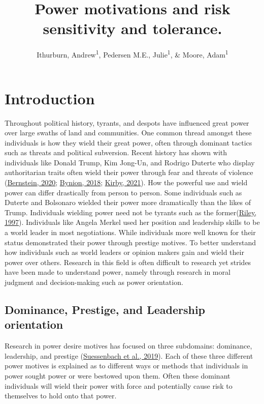 \documentclass[
  donotrepeattitle,doc, 12pt, a4paper,floatsintext]{apa7}
\title{Power motivations and risk sensitivity and tolerance.}
\author{Ithurburn, Andrew\textsuperscript{1}, Pedersen M.E., Julie\textsuperscript{1}, \& Moore, Adam\textsuperscript{1}}
\date{}
\affiliation{\vspace{0.5cm}\textsuperscript{1} The University of Edinburgh}
\begin{document}
\maketitle

\hypertarget{introduction}{%
\section{Introduction}\label{introduction}}

Throughout political history, tyrants, and despots have influenced great power over large swaths of land and communities. One common thread amongst these individuals is how they wield their great power, often through dominant tactics such as threats and political subversion. Recent history has shown with individuals like Donald Trump, Kim Jong-Un, and Rodrigo Duterte who display authoritarian traits often wield their power through fear and threats of violence (\protect\hyperlink{ref-bernstein2020}{Bernstein, 2020}; \protect\hyperlink{ref-bynion2018}{Bynion, 2018}; \protect\hyperlink{ref-kirby2021}{Kirby, 2021}). How the powerful use and wield power can differ drastically from person to person. Some individuals such as Duterte and Bolsonaro wielded their power more dramatically than the likes of Trump. Individuals wielding power need not be tyrants such as the former(\protect\hyperlink{ref-riley1997}{Riley, 1997}). Individuals like Angela Merkel used her position and leadership skills to be a world leader in most negotiations. While individuals more well known for their status demonstrated their power through prestige motives. To better understand how individuals such as world leaders or opinion makers gain and wield their power over others. Research in this field is often difficult to research yet strides have been made to understand power, namely through research in moral judgment and decision-making such as power orientation.

\hypertarget{dominance-prestige-and-leadership-orientation}{%
\subsection{Dominance, Prestige, and Leadership orientation}\label{dominance-prestige-and-leadership-orientation}}

Research in power desire motives has focused on three subdomains: dominance, leadership, and prestige (\protect\hyperlink{ref-suessenbach2019}{Suessenbach et al., 2019}). Each of these three different power motives is explained as to different ways or methods that individuals in power sought power or were bestowed upon them. Often these dominant individuals will wield their power with force and potentially cause risk to themselves to hold onto that power.
\end{document}
